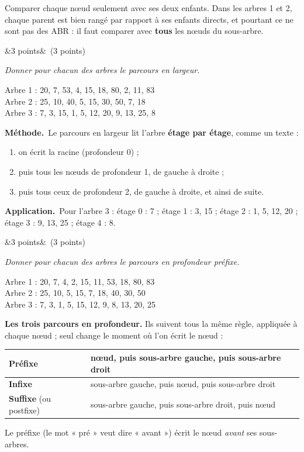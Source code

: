 \documentclass[11pt, a4paper]{exam}
\newcommand{\Q}[3]{\par\needspace{5\baselineskip}\bigskip\noindent{\large\bfseries Question #1}\ifx&#2&\else\ \textnormal{(#2)}\fi\par\nopagebreak\smallskip\noindent\textit{#3}\par\nopagebreak\smallskip}
\newcommand{\methode}{\par\noindent\textbf{Méthode.}\ }
\newcommand{\application}{\par\noindent\textbf{Application.}\ }
\begin{document}
\begin{erreur}
Comparer chaque nœud seulement avec ses deux enfants. Dans les arbres 1 et 2, chaque parent est bien rangé par rapport à ses enfants directs, et pourtant ce ne sont pas des ABR : il faut comparer avec \textbf{tous} les nœuds du sous-arbre.
\end{erreur}

\Q{7}{3 points}{Donner pour chacun des arbres le parcours en largeur.}
\begin{reponse}
Arbre 1 : 20, 7, 53, 4, 15, 18, 80, 2, 11, 83 \\
Arbre 2 : 25, 10, 40, 5, 15, 30, 50, 7, 18 \\
Arbre 3 : 7, 3, 15, 1, 5, 12, 20, 9, 13, 25, 8
\end{reponse}
\methode Le parcours en largeur lit l'arbre \textbf{étage par étage}, comme un texte :
\begin{enumerate}
\item on écrit la racine (profondeur 0) ;
\item puis tous les nœuds de profondeur 1, de gauche à droite ;
\item puis tous ceux de profondeur 2, de gauche à droite, et ainsi de suite.
\end{enumerate}
\application Pour l'arbre 3 : étage 0 : 7 ; étage 1 : 3, 15 ; étage 2 : 1, 5, 12, 20 ; étage 3 : 9, 13, 25 ; étage 4 : 8.

\Q{8}{3 points}{Donner pour chacun des arbres le parcours en profondeur préfixe.}
\begin{reponse}
Arbre 1 : 20, 7, 4, 2, 15, 11, 53, 18, 80, 83 \\
Arbre 2 : 25, 10, 5, 15, 7, 18, 40, 30, 50 \\
Arbre 3 : 7, 3, 1, 5, 15, 12, 9, 8, 13, 20, 25
\end{reponse}
\textbf{Les trois parcours en profondeur.} Ils suivent tous la même règle, appliquée à chaque nœud ; seul change le moment où l'on écrit le nœud :
\begin{center}
\renewcommand{\arraystretch}{1.3}
\begin{tabular}{|l|l|}
\hline
\textbf{Préfixe} & nœud, puis sous-arbre gauche, puis sous-arbre droit \\ \hline
\textbf{Infixe} & sous-arbre gauche, puis nœud, puis sous-arbre droit \\ \hline
\textbf{Suffixe} (ou postfixe) & sous-arbre gauche, puis sous-arbre droit, puis nœud \\ \hline
\end{tabular}
\end{center}
Le préfixe (le mot « pré » veut dire « avant ») écrit le nœud \emph{avant} ses sous-arbres.
\end{document}
